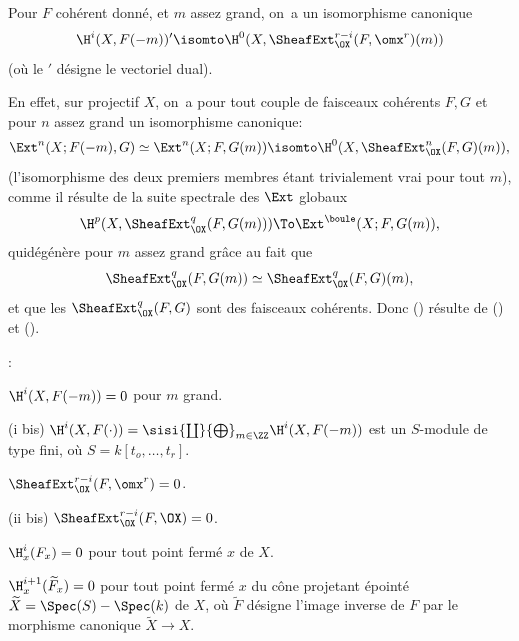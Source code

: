 \begin{corollaire} \label{XII.1.2} Pour $F$ coh\'erent donn\'e, et $m$ assez grand, on~a un isomorphisme canonique
\steco
\begin{equation} \label{eq:XII.5} {}\H^i(X, F(-m))'\isomto\H^0(X, \SheafExt_{\OX}^{r-i}(F, \omx^r)(m))
\end{equation}
(o\`u le $'$ d\'esigne le vectoriel dual).
\end{corollaire}
En effet, sur  projectif $X$, on~a pour tout couple de faisceaux coh\'erents $F, G$ et pour $n$ assez grand un isomorphisme canonique:
\steco
\begin{equation} \label{eq:XII.6} {}\Ext^n(X;F(-m), G)\simeq \Ext^n(X;F, G(m)) \isomto \H^0(X, \SheafExt_{\OX}^{n}(F, G)(m)),
\end{equation}
(l'isomorphisme des deux premiers membres \'etant trivialement vrai pour tout $m$), comme il r\'esulte de la suite spectrale des $\Ext$ globaux
\[
\H^p(X, \SheafExt^q_{\OX}(F, G(m))) \To \Ext^{\boule}(X;F, G(m)),
\]
qui\pageoriginale d\'eg\'en\`ere pour $m$ assez grand gr\^ace au fait que
\[
\SheafExt^q_{\OX}(F, G(m)) \simeq \SheafExt^q_{\OX}(F, G)(m),
\]
et que les $\SheafExt^q_{\OX}(F, G)$ sont des faisceaux coh\'erents. Donc () r\'esulte de () et ().

\begin{corollaire} \label{XII.1.3}
:
\begin{enumeratei}
\item
$\H^i(X, F(-m))=0$ pour $m$ grand.
\item[\textup{(i bis)}] $\H^i(X, F(\cdot))= \sisi{\coprod}{\bigoplus}_{m\in\ZZ}\H^i(X, F(-m))$ est un $S$-module de type fini, o\`u $S=k[t_o, \ldots, t_r]$.
\item
$\SheafExt^{r-i}_{\OX}(F, \omx^r)=0$.
\item[\textup{(ii bis)}] $\SheafExt^{r-i}_{\OX}(F, \OX)=0$.
\item
$\H^i_x(F_x)=0$ pour tout point ferm\'e $x$ de $X$.
\item
$\H^{i+1}_x(\widetilde{F}_x)=0$ pour tout point ferm\'e $x$ du c\^{o}ne projetant \'epoint\'e $\widetilde{X}=\Spec(S)-\Spec(k)$ de $X$, o\`u $\widetilde{F}$ d\'esigne l'image inverse de $F$ par le morphisme canonique $\widetilde{X}\to X$.
\end{enumeratei}
\end{corollaire}

